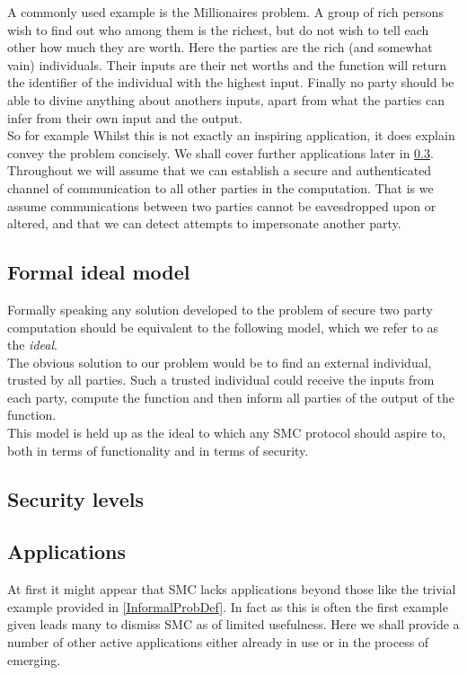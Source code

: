 \documentclass[a4paper,10pt]{article}
\begin{document}
      A commonly used example is the Millionaires problem. A group of rich persons wish to find out who among them is the richest, but do not wish to tell each other how much they are worth. Here the parties are the rich (and somewhat vain) individuals. Their inputs are their net worths and the function will return the identifier of the individual with the highest input. Finally no party should be able to divine anything about anothers inputs, apart from what the parties can infer from their own input and the output.\\
      
      So for example Whilst this is not exactly an inspiring application, it does explain convey the problem concisely. We shall cover further applications later in \ref{Applications}.\\

      Throughout we will assume that we can establish a secure and authenticated channel of communication to all other parties in the computation. That is we assume communications between two parties cannot be eavesdropped upon or altered, and that we can detect attempts to impersonate another party.


    \subsection{Formal ideal model}
      Formally speaking any solution developed to the problem of secure two party computation should be equivalent to the following model, which we refer to as the \emph{ideal}.\\

      The obvious solution to our problem would be to find an external individual, trusted by all parties. Such a trusted individual could receive the inputs from each party, compute the function and then inform all parties of the output of the function.\\

      This model is held up as the ideal to which any SMC protocol should aspire to, both in terms of functionality and in terms of security.
	

    \subsection{Security levels}\label{securityLevels}


    \subsection{Applications} \label{Applications}
      At first it might appear that SMC lacks applications beyond those like the trivial example provided in \ref{InformalProbDef}. In fact as this is often the first example given leads many to dismiss SMC as of limited usefulness. Here we shall provide a number of other active applications either already in use or in the process of emerging.\\
      
\end{document}
